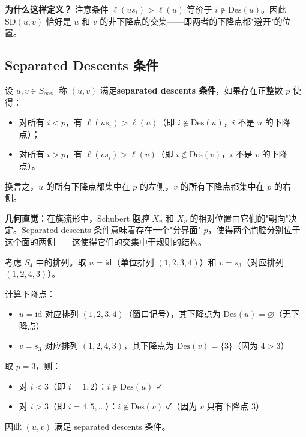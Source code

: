 \textbf{为什么这样定义？} 注意条件 $\ell(us_i) > \ell(u)$ 等价于 $i \notin \mathrm{Des}(u)$。因此 $\mathrm{SD}(u,v)$ 恰好是 $u$ 和 $v$ 的非下降点的交集——即两者的下降点都"避开"的位置。

\subsection{Separated Descents 条件}

\begin{Definition}
\label{def:SeparatedDescents-Samuel}
设 $u, v \in S_\infty$。称 $(u, v)$ 满足\textbf{separated descents 条件}，如果存在正整数 $p$ 使得：
\begin{itemize}
\item 对所有 $i < p$，有 $\ell(us_i) > \ell(u)$（即 $i \notin \mathrm{Des}(u)$，$i$ 不是 $u$ 的下降点）；
\item 对所有 $i > p$，有 $\ell(vs_i) > \ell(v)$（即 $i \notin \mathrm{Des}(v)$，$i$ 不是 $v$ 的下降点）。
\end{itemize}
换言之，$u$ 的所有下降点都集中在 $p$ 的左侧，$v$ 的所有下降点都集中在 $p$ 的右侧。
\end{Definition}

\textbf{几何直觉}：在旗流形中，Schubert 胞腔 $X_u$ 和 $X_v$ 的相对位置由它们的"朝向"决定。Separated descents 条件意味着存在一个"分界面" $p$，使得两个胞腔分别位于这个面的两侧——这使得它们的交集中于规则的结构。

\begin{Example}
考虑 $S_4$ 中的排列。取 $u = \mathrm{id}$（单位排列 $(1,2,3,4)$）和 $v = s_3$（对应排列 $(1,2,4,3)$）。

计算下降点：
\begin{itemize}
\item $u = \mathrm{id}$ 对应排列 $(1,2,3,4)$（窗口记号），其下降点为 $\mathrm{Des}(u) = \varnothing$（无下降点）
\item $v = s_3$ 对应排列 $(1,2,4,3)$，其下降点为 $\mathrm{Des}(v) = \{3\}$（因为 $4 > 3$）
\end{itemize}

取 $p = 3$，则：
\begin{itemize}
\item 对 $i < 3$（即 $i=1,2$）：$i \notin \mathrm{Des}(u)$ ✓
\item 对 $i > 3$（即 $i=4,5,\ldots$）：$i \notin \mathrm{Des}(v)$ ✓（因为 $v$ 只有下降点 3）
\end{itemize}

因此 $(u, v)$ 满足 separated descents 条件。
\end{Example}

